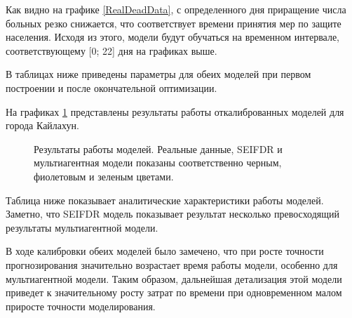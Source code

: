 Как видно на графике \ref{RealDeadData}, с определенного дня приращение числа больных резко снижается, что соответствует времени принятия мер по защите населения. Исходя из этого, модели будут обучаться на временном интервале, соответствующему  [0; 22] дня на графиках выше.

В таблицах ниже приведены параметры для обеих моделей при первом построении и после окончательной оптимизации.


На графиках \ref{FinishedModelDead}  представлены результаты работы откалиброванных моделей для города Кайлахун. 


\begin{figure}[H]
	\caption{Результаты работы моделей. Реальные данные, SEIFDR и мультиагентная модели показаны соответственно черным, фиолетовым и зеленым цветами.}
	\label{FinishedModelDead}
\end{figure}


Таблица ниже показывает аналитические характеристики работы моделей. Заметно, что SEIFDR  модель показывает результат несколько превосходящий результаты мультиагентной модели.

В ходе калибровки обеих моделей было замечено, что при росте точности прогнозирования значительно возрастает время работы модели, особенно для мультиагентной модели. Таким образом, дальнейшая детализация этой модели приведет к значительному росту затрат по времени при одновременном малом приросте точности моделирования. 



